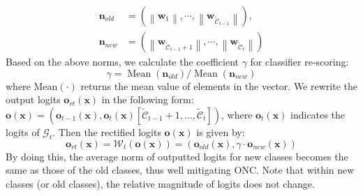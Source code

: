 \documentclass[letterpaper]{article} %
\begin{document}
\begin{equation}
\begin{aligned}
 \boldsymbol{n}_{old}&=\left(\left\|\mathbf{w}_{1}\right\|, \cdots,\left\|\mathbf{w}_{\tilde{\mathcal{C}}_{t-1}}\right\|\right),\\
\boldsymbol{n}_{new}&=\left(\left\|\mathbf{w}_{\tilde{\mathcal{C}}_{t-1}+1}\right\|, \cdots,\left\|\mathbf{w}_{\tilde{\mathcal{C}}_{t}}\right\|\right) \label{e8}
\end{aligned}
\end{equation}
Based on the above norms, we calculate the coefficient $\gamma$ for classifier re-scoring:
\begin{equation}
\gamma={\operatorname{Mean}\left(\boldsymbol{n}_{{old }}\right)}/{\operatorname{Mean}\left(\boldsymbol{n}_{{new }}\right)}
\label{e9}
\end{equation}
where $\operatorname{Mean(\cdot)}$ returns the mean value of elements in the vector. We rewrite the output logits $\boldsymbol{o}_{rt}(\boldsymbol{x})$ in the following form: $\boldsymbol{o}(\boldsymbol{x})=(\boldsymbol{o}_{t-1}(\boldsymbol{x}), \boldsymbol{o}_{t}(\boldsymbol{x})[\tilde{\mathcal{C}}_{t-1}+1,\dots,\tilde{\mathcal{C}}_{t}])$, where $\boldsymbol{o}_{t}(\boldsymbol{x})$ indicates the logits of $\mathcal{G}_{t}$. Then the rectified logits $\boldsymbol{o}(\boldsymbol{x})$ is given by:
\begin{equation}
\boldsymbol{o}_{rt}(\boldsymbol{x})=\mathcal{W}_{t}(\boldsymbol{o}(\boldsymbol{x})) = \left(\mathbf{o}_{o l d}(\boldsymbol{x}), \gamma \cdot \boldsymbol{o}_{n e w}(\boldsymbol{x})\right)
\label{e11}
\end{equation}
By doing this, the average norm of outputted logits for new classes becomes the same as those of the old classes, thus well mitigating ONC. Note that within new classes (or old classes), the relative magnitude of logits does not change.
\end{document}
